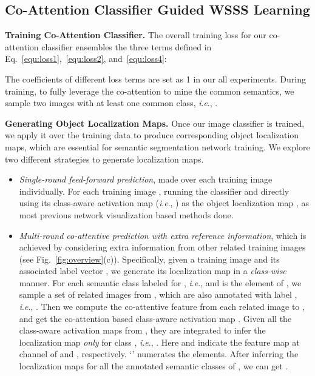 \documentclass[runningheads]{llncs}
\newcommand{\ie}{\textit{i}.\textit{e}.}
\begin{document}
\vspace{-3pt}
\subsection{Co-Attention Classifier Guided WSSS Learning}\label{inference}
\vspace{-1pt}
\noindent\textbf{Training Co-Attention Classifier.} The overall training loss for  our co-attention  classifier ensembles the three terms defined in Eq.~\ref{equ:loss1},~\ref{equ:loss2}, and~\ref{equ:loss4}:
\vspace{-1pt}

The coefficients of different loss terms are set as 1 in our all experiments. During training, to fully leverage the co-attention to mine the common semantics,  we sample two images  with at least one common class, \ie, . 

\noindent\textbf{Generating Object Localization Maps.} Once our image classifier is trained, we apply it over the training data  to produce corresponding object localization maps, which are essential for semantic segmentation network training. We explore two different strategies to generate localization maps.
\vspace*{-0pt}
\begin{itemize}[leftmargin=*]
	\setlength{\itemsep}{0pt}
	\setlength{\parsep}{-2pt}
	\setlength{\parskip}{-0pt}
	\setlength{\leftmargin}{-13pt}
	\vspace{-5pt}
    \item \textit{Single-round feed-forward prediction}, made over each training image individually.  For each training image , running the classifier and directly using its class-aware activation map  (\ie, ) as the object localization map , as most previous network visualization based methods \cite{oaa2019,lee2019frame,shen2018bootstrapping} done.
\item \textit{Multi-round co-attentive prediction with extra reference information}, which is achieved by considering extra information from other related training images (see Fig.~\ref{fig:overview}(c)). Specifically, given a training image  and its associated label vector , we generate its localization map  in a \textit{class-wise} manner. For each semantic class  labeled for , \ie,  and  is the  element of , we sample a set of related images  from , which are also annotated with label , \ie, . Then we compute the co-attentive feature  from each related image  to , and get the co-attention based class-aware activation map . Given all the class-aware activation maps  from , they are integrated to infer the localization map \textit{only} for class , \ie, .
Here  and  indicate the feature map at  channel of  and , respectively. `' numerates the elements.  After inferring the localization maps for all the annotated semantic classes of , we can get .
\vspace*{-2pt}
\end{itemize}
\end{document}
